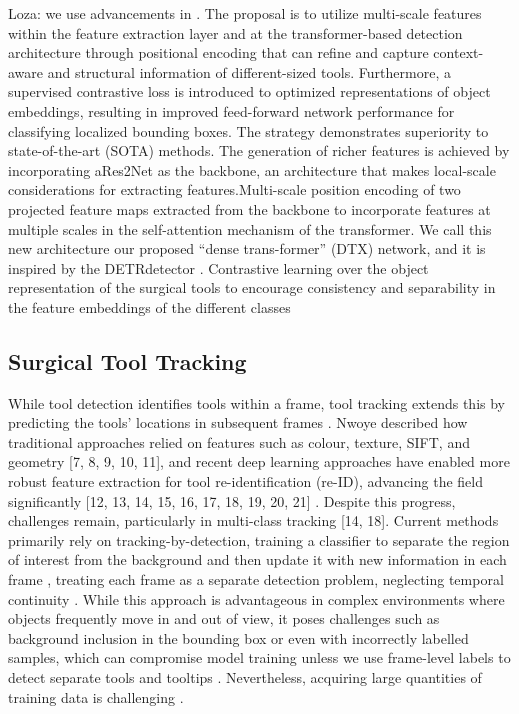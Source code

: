 Loza: we use advancements in \cite{Loza2023DTx}. The proposal is to utilize multi-scale features within the feature extraction layer and at the transformer-based detection architecture through positional encoding that can reﬁne and capture context-aware and structural information of different-sized tools. Furthermore, a supervised contrastive loss is introduced to optimized representations of object embeddings, resulting in improved feed-forward network performance for classifying localized bounding boxes. The strategy demonstrates superiority to state-of-the-art (SOTA) methods. The generation of richer features is achieved by incorporating aRes2Net 
as the backbone, an architecture that makes local-scale considerations for extracting features.Multi-scale position encoding of two projected feature maps extracted from the backbone to incorporate features at multiple scales in the self-attention mechanism of the transformer. We call this new architecture our proposed “dense trans-former” (DTX) network, and it is inspired by the DETRdetector \cite{vedaldi_end--end_2020}. Contrastive learning over the object representation of the surgical tools to encourage consistency and separability in the feature embeddings of the different classes

\subsection{Surgical Tool Tracking}

While tool detection identifies tools within a frame, tool tracking extends this by predicting the tools’ locations in subsequent frames \cite{SurgiTrack}. Nwoye described how traditional approaches relied on features such as colour, texture, SIFT, and geometry [7, 8, 9, 10, 11], and recent deep learning approaches have enabled more robust feature extraction for tool re-identification (re-ID), advancing the field significantly [12, 13, 14, 15, 16, 17, 18, 19, 20, 21] \cite{SurgiTrack}. Despite this progress, challenges remain, particularly in multi-class tracking [14, 18]. Current methods primarily rely on tracking-by-detection, training a classifier to separate the region of interest from the background and then update it with new information in each frame \cite{ali2023comprehensivesurveyrecentdeep}, treating each frame as a separate detection problem, neglecting temporal continuity \cite{https://www.sciencedirect.com/science/article/pii/S1361841516301657}. While this approach is advantageous in complex environments where objects frequently move in and out of view, it poses challenges such as background inclusion in the bounding box or even with incorrectly labelled samples, which can compromise model training unless we use frame-level labels to detect separate tools and tooltips \cite{ali2023comprehensivesurveyrecentdeep}. Nevertheless, acquiring large quantities of training data is challenging \cite{bodenstedt_comparative_2018}.

